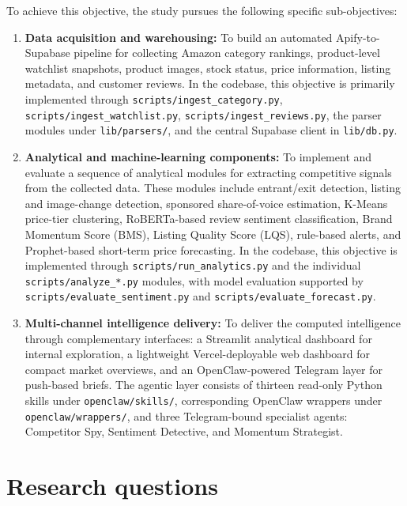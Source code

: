 To achieve this objective, the study pursues the following specific
sub-objectives:
\begin{enumerate}
    \item \textbf{Data acquisition and warehousing:} To build an
    automated Apify-to-Supabase pipeline for collecting Amazon category
    rankings, product-level watchlist snapshots, product images, stock
    status, price information, listing metadata, and customer reviews.
    In the codebase, this objective is primarily implemented through
    \texttt{scripts/ingest\_category.py},
    \texttt{scripts/ingest\_watchlist.py},
    \texttt{scripts/ingest\_reviews.py}, the parser modules under
    \texttt{lib/parsers/}, and the central Supabase client in
    \texttt{lib/db.py}.

    \item \textbf{Analytical and machine-learning components:} To
    implement and evaluate a sequence of analytical modules for
    extracting competitive signals from the collected data. These
    modules include entrant/exit detection, listing and image-change
    detection, sponsored share-of-voice estimation, K-Means price-tier
    clustering, RoBERTa-based review sentiment classification, Brand
    Momentum Score (BMS), Listing Quality Score (LQS), rule-based alerts,
    and Prophet-based short-term price forecasting. In the codebase, this
    objective is implemented through \texttt{scripts/run\_analytics.py}
    and the individual \texttt{scripts/analyze\_*.py} modules, with
    model evaluation supported by \texttt{scripts/evaluate\_sentiment.py}
    and \texttt{scripts/evaluate\_forecast.py}.

    \item \textbf{Multi-channel intelligence delivery:} To deliver the
    computed intelligence through complementary interfaces: a Streamlit
    analytical dashboard for internal exploration, a lightweight
    Vercel-deployable web dashboard for compact market overviews, and an
    OpenClaw-powered Telegram layer for push-based briefs. The agentic
    layer consists of thirteen read-only Python skills under
    \texttt{openclaw/skills/}, corresponding OpenClaw wrappers under
    \texttt{openclaw/wrappers/}, and three Telegram-bound specialist
    agents: Competitor Spy, Sentiment Detective, and Momentum Strategist.
\end{enumerate}

\section{Research questions}

